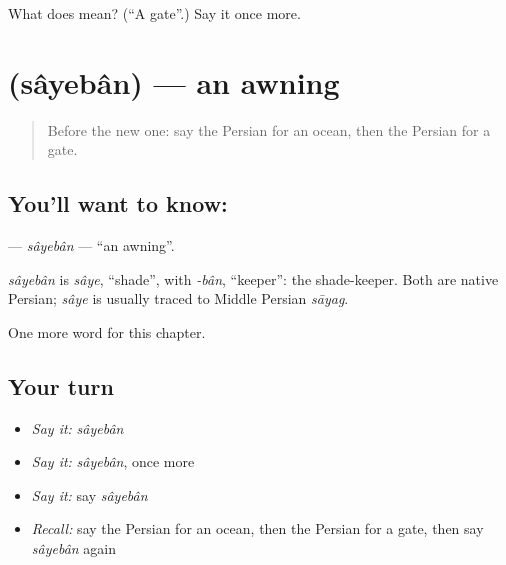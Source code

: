 \begin{tcolorbox}[breakable,colback=teal!4,colframe=teal!35!black,title={Before you move on}]
What does  mean? (\textquotedblleft{}A gate\textquotedblright{}.) Say it once more.
\end{tcolorbox}
\section[\texorpdfstring{\fa{سایبان} (sâyebân)}{سایبان (sâyebân)}]{ (sâyebân) — an awning}

\label{lesson:FA-C268-sayeban}



\begin{quote}
Before the new one: say the Persian for an ocean, then the Persian for a gate.
\end{quote}

\subsection*{You'll want to know: }
\textbf{} — \emph{sâyebân} — \textquotedblleft{}an awning\textquotedblright{}.

\begin{cousinweb}
\emph{sâyebân} is \emph{sâye}, \textquotedblleft{}shade\textquotedblright{}, with \emph{-bân}, \textquotedblleft{}keeper\textquotedblright{}: the shade-keeper. Both are native Persian; \emph{sâye} is usually traced to Middle Persian \emph{sāyag}.
\end{cousinweb}

\begin{grammarlens}[title={What you've built}]
One more word for this chapter.
\end{grammarlens}

\subsection*{Your turn}
\begin{itemize}
\raggedright
  \item \emph{Say it:} \emph{sâyebân}
  \item \emph{Say it:} \emph{sâyebân}, once more
  \item \emph{Say it:} say \emph{sâyebân}
  \item \emph{Recall:} say the Persian for an ocean, then the Persian for a gate, then say \emph{sâyebân} again
\end{itemize}

